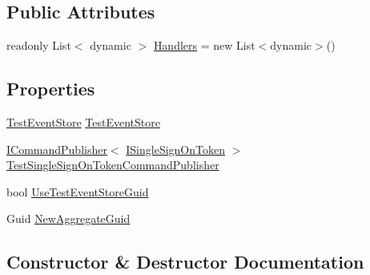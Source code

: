 \subsection*{Public Attributes}
\begin{DoxyCompactItemize}
\item 
readonly List$<$ dynamic $>$ \hyperlink{classCqrs_1_1Tests_1_1Substitutes_1_1TestDependencyResolver_a6fd9194240dd3d95fec9ba3788ac67e4_a6fd9194240dd3d95fec9ba3788ac67e4}{Handlers} = new List$<$dynamic$>$()
\end{DoxyCompactItemize}
\subsection*{Properties}
\begin{DoxyCompactItemize}
\item 
\hyperlink{classCqrs_1_1Tests_1_1Substitutes_1_1TestEventStore}{Test\+Event\+Store} \hyperlink{classCqrs_1_1Tests_1_1Substitutes_1_1TestDependencyResolver_a1102f66163e9313777a41fff54aa5a75_a1102f66163e9313777a41fff54aa5a75}{Test\+Event\+Store}
\item 
\hyperlink{interfaceCqrs_1_1Commands_1_1ICommandPublisher}{I\+Command\+Publisher}$<$ \hyperlink{interfaceCqrs_1_1Authentication_1_1ISingleSignOnToken}{I\+Single\+Sign\+On\+Token} $>$ \hyperlink{classCqrs_1_1Tests_1_1Substitutes_1_1TestDependencyResolver_a41f52b962e9f15a0d06834022182f760_a41f52b962e9f15a0d06834022182f760}{Test\+Single\+Sign\+On\+Token\+Command\+Publisher}
\item 
bool \hyperlink{classCqrs_1_1Tests_1_1Substitutes_1_1TestDependencyResolver_a000d2ee924b6f60bc77174495ad9ca89_a000d2ee924b6f60bc77174495ad9ca89}{Use\+Test\+Event\+Store\+Guid}
\item 
Guid \hyperlink{classCqrs_1_1Tests_1_1Substitutes_1_1TestDependencyResolver_a8df7ff7fb6f8bd3b2da43fadd46f1cf8_a8df7ff7fb6f8bd3b2da43fadd46f1cf8}{New\+Aggregate\+Guid}
\end{DoxyCompactItemize}


\subsection{Constructor \& Destructor Documentation}
\mbox{\label{classCqrs_1_1Tests_1_1Substitutes_1_1TestDependencyResolver_ad2c04971107ccbd80aa3f5c0440438cb_ad2c04971107ccbd80aa3f5c0440438cb}} 
